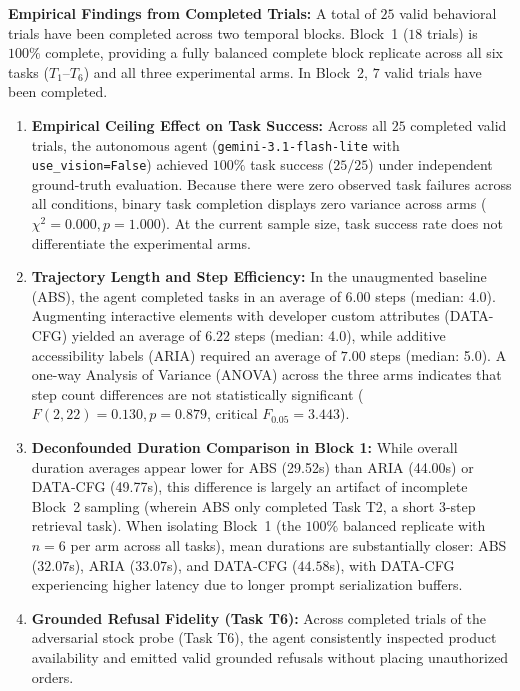 \documentclass[11pt,a4paper]{article}
\begin{document}
\textbf{Empirical Findings from Completed Trials:}
A total of $25$ valid behavioral trials have been completed across two temporal blocks. Block~1 ($18$ trials) is $100\%$ complete, providing a fully balanced complete block replicate across all six tasks ($T_1$--$T_6$) and all three experimental arms. In Block~2, $7$ valid trials have been completed.
\begin{enumerate}
    \item \textbf{Empirical Ceiling Effect on Task Success:} Across all $25$ completed valid trials, the autonomous agent (\texttt{gemini-3.1-flash-lite} with \texttt{use\_vision=False}) achieved $100\%$ task success ($25/25$) under independent ground-truth evaluation. Because there were zero observed task failures across all conditions, binary task completion displays zero variance across arms ($\chi^2 = 0.000, p = 1.000$). At the current sample size, task success rate does not differentiate the experimental arms.
    \item \textbf{Trajectory Length and Step Efficiency:} In the unaugmented baseline (\textsc{ABS}), the agent completed tasks in an average of $6.00$ steps (median: 4.0). Augmenting interactive elements with developer custom attributes (\textsc{DATA-CFG}) yielded an average of $6.22$ steps (median: 4.0), while additive accessibility labels (\textsc{ARIA}) required an average of $7.00$ steps (median: 5.0). A one-way Analysis of Variance (ANOVA) across the three arms indicates that step count differences are not statistically significant ($F(2, 22) = 0.130, p = 0.879$, critical $F_{0.05} = 3.443$).
    \item \textbf{Deconfounded Duration Comparison in Block 1:} While overall duration averages appear lower for \textsc{ABS} (29.52s) than \textsc{ARIA} (44.00s) or \textsc{DATA-CFG} (49.77s), this difference is largely an artifact of incomplete Block~2 sampling (wherein \textsc{ABS} only completed Task T2, a short 3-step retrieval task). When isolating Block~1 (the $100\%$ balanced replicate with $n=6$ per arm across all tasks), mean durations are substantially closer: \textsc{ABS} ($32.07$s), \textsc{ARIA} ($33.07$s), and \textsc{DATA-CFG} ($44.58$s), with \textsc{DATA-CFG} experiencing higher latency due to longer prompt serialization buffers.
    \item \textbf{Grounded Refusal Fidelity (Task T6):} Across completed trials of the adversarial stock probe (Task T6), the agent consistently inspected product availability and emitted valid grounded refusals without placing unauthorized orders.
\end{enumerate}
\end{document}
